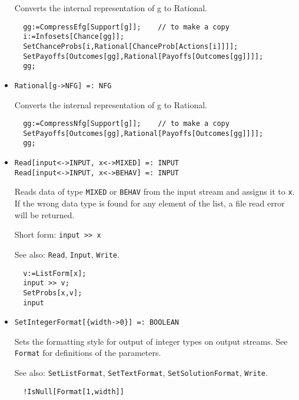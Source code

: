 \begin{itemize}
\bd 
Converts the internal representation of g to Rational.  
\begin{verbatim}
  gg:=CompressEfg[Support[g]];    // to make a copy
  i:=Infosets[Chance[gg]];
  SetChanceProbs[i,Rational[ChanceProb[Actions[i]]]];
  SetPayoffs[Outcomes[gg],Rational[Payoffs[Outcomes[gg]]]];
  gg;
\end{verbatim} 
\ed

\item{}
\protect \large \begin{verbatim}
Rational[g->NFG] =: NFG 
\end{verbatim}\normalsize

\bd 
Converts the internal representation of g to Rational.  
\begin{verbatim}
  gg:=CompressNfg[Support[g]];    // to make a copy
  SetPayoffs[Outcomes[gg],Rational[Payoffs[Outcomes[gg]]]];
  gg;
\end{verbatim} 
\ed

\item{}
\protect \large \begin{verbatim}
Read[input<->INPUT, x<->MIXED] =: INPUT 
Read[input<->INPUT, x<->BEHAV] =: INPUT 
\end{verbatim}\normalsize

\bd 
Reads data of type \verb+MIXED+ or \verb+BEHAV+ from the input
stream and assigns it to \verb+x+.  If the wrong data type is found
for any element of the list, a file read error will be returned.
\item [Short form:] \verb+input >> x+
\item [See also:] \verb+Read+, \verb+Input+, \verb+Write+.
\begin{verbatim}
  v:=ListForm[x];
  input >> v;
  SetProbs[x,v];
  input
\end{verbatim} 
\ed


\item{}
\protect \large \begin{verbatim}
SetIntegerFormat[{width->0}] =: BOOLEAN 
\end{verbatim}\normalsize

\bd 
Sets the formatting style for output of integer types on output
streams.  See \verb+Format+ for definitions of the parameters.
\item [See also:] \verb+SetListFormat+, \verb+SetTextFormat+, 
\verb+SetSolutionFormat+, \verb+Write+.
\begin{verbatim}
  !IsNull[Format[1,width]]
\end{verbatim} 
\ed


\end{itemize}
